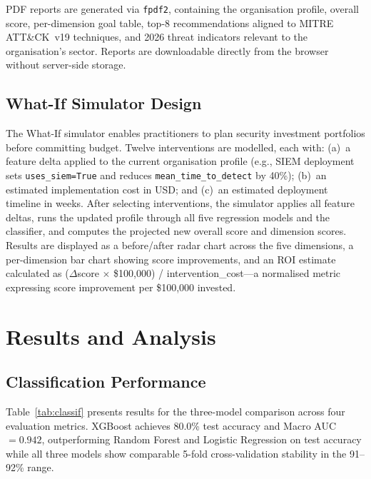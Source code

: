 \documentclass[journal]{IEEEtran}
\begin{document}
PDF reports are generated via \texttt{fpdf2}, containing the organisation
profile, overall score, per-dimension goal table, top-8 recommendations
aligned to MITRE ATT\&CK~v19 techniques, and 2026 threat indicators relevant
to the organisation's sector. Reports are downloadable directly from the
browser without server-side storage.

\subsection{What-If Simulator Design}

The What-If simulator enables practitioners to plan security investment
portfolios before committing budget. Twelve interventions are modelled, each
with: (a)~a feature delta applied to the current organisation profile (e.g.,
SIEM deployment sets \texttt{uses\_siem=True} and reduces
\texttt{mean\_time\_to\_detect} by 40\%); (b)~an estimated implementation
cost in USD; and (c)~an estimated deployment timeline in weeks. After
selecting interventions, the simulator applies all feature deltas, runs the
updated profile through all five regression models and the classifier,
and computes the projected new overall score and dimension scores. Results
are displayed as a before/after radar chart across the five dimensions, a
per-dimension bar chart showing score improvements, and an ROI estimate
calculated as ($\Delta$score $\times$ \$100,000) / intervention\_cost---a
normalised metric expressing score improvement per \$100,000 invested.


\section{Results and Analysis}
\label{sec:results}

\subsection{Classification Performance}

Table~\ref{tab:classif} presents results for the three-model comparison across
four evaluation metrics. XGBoost achieves 80.0\% test accuracy and Macro
AUC~$= 0.942$, outperforming Random Forest and Logistic Regression on test
accuracy while all three models show comparable 5-fold cross-validation
stability in the 91--92\% range.
\end{document}

